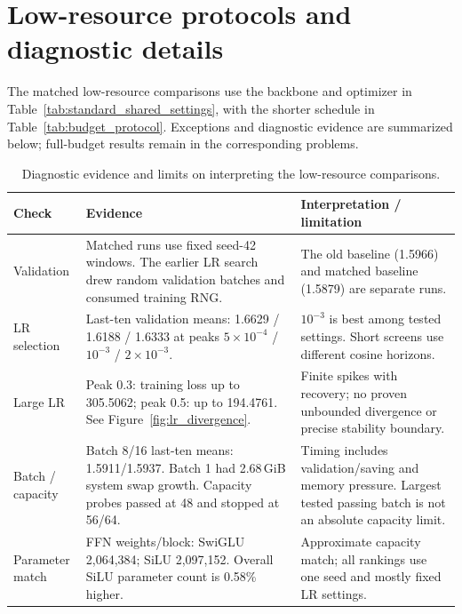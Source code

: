 \clearpage
{}
\section{Low-resource protocols and diagnostic details}
\label{app:diagnostics}

The matched low-resource comparisons use the backbone and optimizer in
Table~\ref{tab:standard_shared_settings}, with the shorter schedule in
Table~\ref{tab:budget_protocol}. Exceptions and diagnostic evidence are
summarized below; full-budget results remain in the corresponding problems.

\begin{table}[htbp]
    \centering\footnotesize
    \begin{tabular}{@{}>{\raggedright\arraybackslash}p{}
        >{\raggedright\arraybackslash}p{}
        >{\raggedright\arraybackslash}p{}@{}}
        \toprule
        Check & Evidence & Interpretation / limitation \\
        \midrule
        Validation & Matched runs use fixed seed-42 windows. The earlier
        LR search drew random validation batches and consumed training RNG.
        & The old baseline (1.5966) and matched baseline (1.5879) are separate runs. \\
        \addlinespace
        LR selection & Last-ten validation means: 1.6629 / 1.6188 / 1.6333
        at peaks $5\times10^{-4}$ / $10^{-3}$ / $2\times10^{-3}$.
        & $10^{-3}$ is best among tested settings. Short screens use
        different cosine horizons. \\
        \addlinespace
        Large LR & Peak 0.3: training loss up to 305.5062; peak 0.5:
        up to 194.4761. See Figure~\ref{fig:lr_divergence}.
        & Finite spikes with recovery; no proven unbounded divergence
        or precise stability boundary. \\
        \addlinespace
        Batch / capacity & Batch 8/16 last-ten means: 1.5911/1.5937.
        Batch 1 had 2.68\,GiB system swap growth. Capacity probes passed
        at 48 and stopped at 56/64.
        & Timing includes validation/saving and memory pressure.
        Largest tested passing batch is not an absolute capacity limit. \\
        \addlinespace
        Parameter match & FFN weights/block: SwiGLU 2,064,384;
        SiLU 2,097,152. Overall SiLU parameter count is 0.58\% higher.
        & Approximate capacity match; all rankings use one seed and
        mostly fixed LR settings. \\
        \bottomrule
    \end{tabular}
    \caption{Diagnostic evidence and limits on interpreting the low-resource comparisons.}
    \label{tab:diagnostic_summary}
\end{table}

